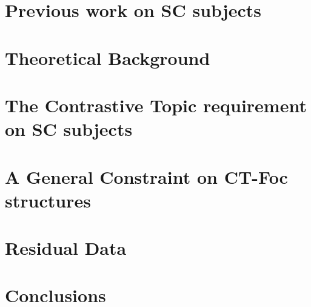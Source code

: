 \documentclass[letterpaper]{article}
\begin{document}
\section{Previous work on SC subjects}\label{sec:LitReview}

\section{Theoretical Background}\label{sec:TheoryBackground}

\section{The Contrastive Topic requirement on SC subjects}\label{sec:MainArgument}

\section{A General Constraint on CT-Foc structures}

\section{Residual Data}\label{sec:Leftovers}

\section{Conclusions}\label{sec:Conclusion}
\printbibliography
\end{document}
